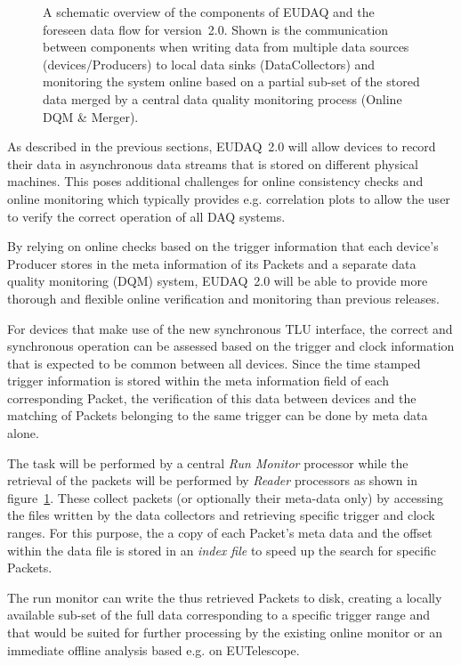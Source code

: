 \documentclass[paper=a4, fontsize=11pt, titlepage]{scrartcl}	%
\numberwithin{equation}{section}		%
\numberwithin{figure}{section}			%
\numberwithin{table}{section}           	%
\begin{document}
  \begin{figure}[hbt]\centering
      
      \caption{A schematic overview of the components of EUDAQ and the
        foreseen data flow for version~2.0. Shown is the communication between
        components when writing data from multiple data sources
        (devices/Producers) to local data sinks (DataCollectors) and
        monitoring the system online based on a partial sub-set of the
        stored data merged by a central data quality monitoring
        process (Online DQM \& Merger).}
  \label{fig:mdc}
\end{figure}

As described in the previous sections, EUDAQ~2.0 will allow devices to
record their data in asynchronous data streams that is stored on
different physical machines. This poses additional challenges for
online consistency checks and online monitoring which typically
provides e.g. correlation plots to allow the user to verify the
correct operation of all DAQ systems.

By relying on online checks based on the trigger information that each
device's Producer stores in the meta information of its Packets and a
separate data quality monitoring (DQM) system, EUDAQ~2.0 will be able
to provide more thorough and flexible online verification and
monitoring than previous releases.

For devices that make use of the new synchronous TLU interface,
the correct and synchronous operation can be assessed based on the trigger
and clock information that is expected to be common between all
devices. Since the time stamped trigger information is stored within
the meta information field of each corresponding Packet, the
verification of this data between devices and the matching of Packets
belonging to the same trigger can be done by meta data alone.


The task will be performed
by a central \emph{Run Monitor} processor while the retrieval of the
packets will be performed by \emph{Reader} processors as shown in
figure~\ref{fig:mdc}. These collect packets (or
optionally their meta-data only) by accessing the files written by the
data collectors and retrieving specific trigger and clock ranges. For
this purpose, the a copy of each Packet's meta data and the offset
within the data file is stored in an \emph{index
  file} to speed up the search for specific Packets.

The
run monitor can write the thus retrieved Packets to disk, creating a
locally available sub-set of the
full data corresponding to a specific trigger range and that would be suited
for further processing by the existing online monitor or an immediate
offline analysis based e.g. on EUTelescope.
\end{document}
